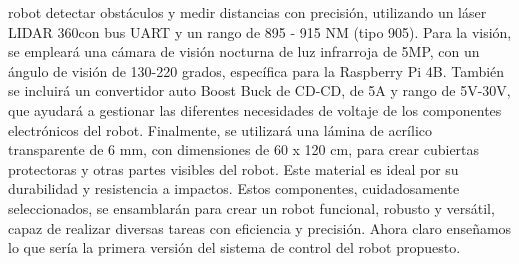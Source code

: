         robot detectar obst\'aculos y medir distancias con precisi\'on, utilizando un l\'aser LIDAR 360\degree con bus UART 
        y un rango de 895 - 915 NM (tipo 905).
    \vskip 0.5cm
    Para la visi\'on, se emplear\'a una c\'amara de visi\'on nocturna de luz infrarroja de 5MP, con un \'angulo de visi\'on de 
        130-220 grados, espec\'ifica para la Raspberry Pi 4B. Tambi\'en se incluir\'a un convertidor auto Boost Buck de CD-CD, 
        de 5A y rango de 5V-30V, que ayudar\'a a gestionar las diferentes necesidades de voltaje de los componentes 
        electr\'onicos del robot.
    \vskip 0.5cm
    Finalmente, se utilizar\'a una l\'amina de acr\'ilico transparente de 6 mm, con dimensiones de 60 x 120 cm, 
        para crear cubiertas protectoras y otras partes visibles del robot. Este material es ideal por su 
        durabilidad y resistencia a impactos.
    \vskip 0.5cm
    Estos componentes, cuidadosamente seleccionados, se ensamblar\'an para crear un robot funcional, 
        robusto y vers\'atil, capaz de realizar diversas tareas con eficiencia y precisi\'on.
    \vskip 0.5cm
    Ahora claro ense\~namos lo que ser\'ia la primera versi\'on del sistema de control del robot propuesto.
    
